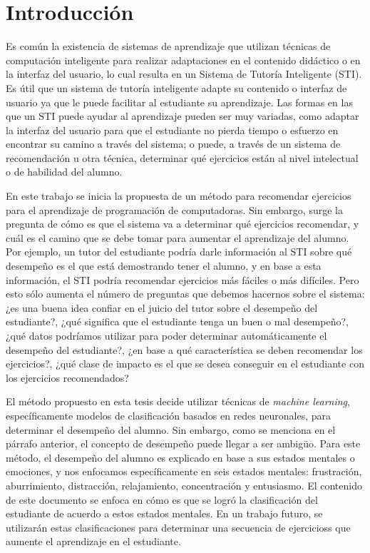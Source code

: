 
\chapter{Introducción}

Es común la existencia de sistemas de aprendizaje que utilizan técnicas de computación inteligente para realizar adaptaciones en el contenido didáctico o en la interfaz del usuario, lo cual resulta en un Sistema de Tutoría Inteligente (STI). Es útil que un sistema de tutoría inteligente adapte su contenido o interfaz de usuario ya que le puede facilitar al estudiante su aprendizaje. Las formas en las que un STI puede ayudar al aprendizaje pueden ser muy variadas, como adaptar la interfaz del usuario para que el estudiante no pierda tiempo o esfuerzo en encontrar su camino a través del sistema; o puede, a través de un sistema de recomendación u otra técnica, determinar qué ejercicios están al nivel intelectual o de habilidad del alumno.

En este trabajo se inicia la propuesta de un método para recomendar ejercicios para el aprendizaje de programación de computadoras. Sin embargo, surge la pregunta de cómo es que el sistema va a determinar qué ejercicios recomendar, y cuál es el camino que se debe tomar para aumentar el aprendizaje del alumno. Por ejemplo, un tutor del estudiante podría darle información al STI sobre qué desempeño es el que está demostrando tener el alumno, y en base a esta información, el STI podría recomendar ejercicios más fáciles o más difíciles. Pero esto sólo aumenta el número de preguntas que debemos hacernos sobre el sistema: ¿es una buena idea confiar en el juicio del tutor sobre el desempeño del estudiante?, ¿qué significa que el estudiante tenga un buen o mal desempeño?, ¿qué datos podríamos utilizar para poder determinar automáticamente el desempeño del estudiante?, ¿en base a qué característica se deben recomendar los ejercicios?, ¿qué clase de impacto es el que se desea conseguir en el estudiante con los ejercicios recomendados?

El método propuesto en esta tesis decide utilizar técnicas de \textit{machine learning}, específicamente modelos de clasificación basados en redes neuronales, para determinar el desempeño del alumno. Sin embargo, como se menciona en el párrafo anterior, el concepto de desempeño puede llegar a ser ambigüo. Para este método, el desempeño del alumno es explicado en base a sus estados mentales o emociones, y nos enfocamos específicamente en seis estados mentales: frustración, aburrimiento, distracción, relajamiento, concentración y entusiasmo. El contenido de este documento se enfoca en cómo es que se logró la clasificación del estudiante de acuerdo a estos estados mentales. En un trabajo futuro, se utilizarán estas clasificaciones para determinar una secuencia de ejercicioss que aumente el aprendizaje en el estudiante.

